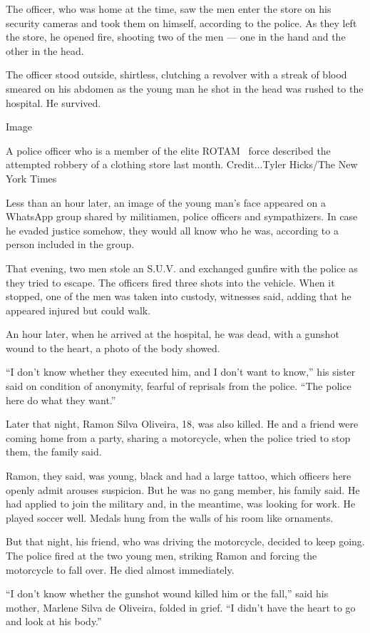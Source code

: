 The officer, who was home at the time, saw the men enter the store on
his security cameras and took them on himself, according to the police.
As they left the store, he opened fire, shooting two of the men --- one
in the hand and the other in the head.

The officer stood outside, shirtless, clutching a revolver with a streak
of blood smeared on his abdomen as the young man he shot in the head was
rushed to the hospital. He survived.

Image

A police officer who is a member of the elite ROTAM~ force described the
attempted robbery of a clothing store last month. Credit...Tyler
Hicks/The New York Times

Less than an hour later, an image of the young man's face appeared on a
WhatsApp group shared by militiamen, police officers and sympathizers.
In case he evaded justice somehow, they would all know who he was,
according to a person included in the group.

That evening, two men stole an S.U.V. and exchanged gunfire with the
police as they tried to escape. The officers fired three shots into the
vehicle. When it stopped, one of the men was taken into custody,
witnesses said, adding that he appeared injured but could walk.

An hour later, when he arrived at the hospital, he was dead, with a
gunshot wound to the heart, a photo of the body showed.

``I don't know whether they executed him, and I don't want to know,''
his sister said on condition of anonymity, fearful of reprisals from the
police. ``The police here do what they want.''

Later that night, Ramon Silva Oliveira, 18, was also killed. He and a
friend were coming home from a party, sharing a motorcycle, when the
police tried to stop them, the family said.

Ramon, they said, was young, black and had a large tattoo, which
officers here openly admit arouses suspicion. But he was no gang member,
his family said. He had applied to join the military and, in the
meantime, was looking for work. He played soccer well. Medals hung from
the walls of his room like ornaments.

But that night, his friend, who was driving the motorcycle, decided to
keep going. The police fired at the two young men, striking Ramon and
forcing the motorcycle to fall over. He died almost immediately.

``I don't know whether the gunshot wound killed him or the fall,'' said
his mother, Marlene Silva de Oliveira, folded in grief. ``I didn't have
the heart to go and look at his body.''

